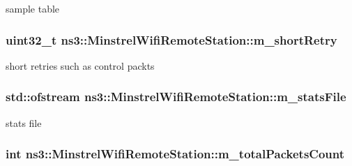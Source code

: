 sample table 

\subsubsection[{\texorpdfstring{m\+\_\+short\+Retry}{m_shortRetry}}]{\setlength{\rightskip}{0pt plus 5cm}uint32\+\_\+t ns3\+::\+Minstrel\+Wifi\+Remote\+Station\+::m\+\_\+short\+Retry}\hypertarget{structns3_1_1MinstrelWifiRemoteStation_a900b790146ac5bce9304d0f8aa32f3d3}{}\label{structns3_1_1MinstrelWifiRemoteStation_a900b790146ac5bce9304d0f8aa32f3d3}


short retries such as control packts 

\subsubsection[{\texorpdfstring{m\+\_\+stats\+File}{m_statsFile}}]{\setlength{\rightskip}{0pt plus 5cm}std\+::ofstream ns3\+::\+Minstrel\+Wifi\+Remote\+Station\+::m\+\_\+stats\+File}\hypertarget{structns3_1_1MinstrelWifiRemoteStation_ac52ac417681f001cf8fb329215ee935d}{}\label{structns3_1_1MinstrelWifiRemoteStation_ac52ac417681f001cf8fb329215ee935d}


stats file 

\subsubsection[{\texorpdfstring{m\+\_\+total\+Packets\+Count}{m_totalPacketsCount}}]{\setlength{\rightskip}{0pt plus 5cm}int ns3\+::\+Minstrel\+Wifi\+Remote\+Station\+::m\+\_\+total\+Packets\+Count}\hypertarget{structns3_1_1MinstrelWifiRemoteStation_a7a0c1cf63d7b7ce3bd25dda10db7f7e7}{}\label{structns3_1_1MinstrelWifiRemoteStation_a7a0c1cf63d7b7ce3bd25dda10db7f7e7}


